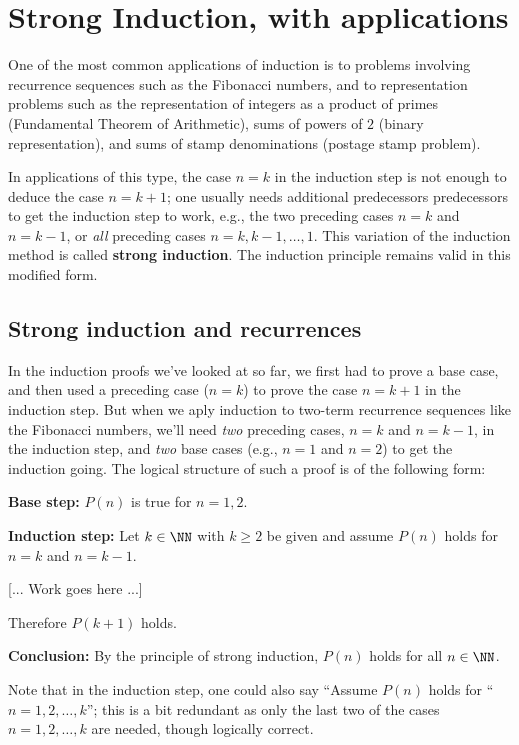 \section{Strong Induction, with applications}
\label{sec:Induction:StrongInduction}


One of the most common applications of induction is to problems involving
recurrence sequences such as the Fibonacci numbers, and to representation
problems such as the representation of integers as a product of primes
(Fundamental Theorem of Arithmetic), sums of powers of $2$ (binary
representation), and sums of stamp denominations (postage stamp problem).

In applications of this type, the case $n=k$ in the induction step is
not enough to deduce the case $n=k+1$; one usually needs additional
predecessors predecessors to get the induction step to work, e.g., 
the two preceding cases $n=k$ and $n=k-1$, or 
\emph{all} preceding cases
$n=k,k-1,\dots,1$.  This variation of the induction
method is called \textbf{strong induction}.  The induction principle
remains valid in this modified form. 


\subsection*{Strong induction and recurrences}
In the induction proofs we've looked at so far, we first had to prove a base case, and then used a preceding case ($n=k$) to prove the case $n=k+1$ in the induction step. But when we aply  induction to two-term recurrence sequences like the Fibonacci
numbers, we'll need \emph{two} preceding cases, $n=k$ and $n=k-1$, in
the induction step, and \emph{two} base cases (e.g., $n=1$ and $n=2$) to get
the induction going.  The logical structure of such a proof is of the
following form:

\noindent
\textbf{Base step:}  $P(n)$ is true for $n=1,2$.
\smallskip

\noindent
\textbf{Induction step:} Let $k\in\NN$ with $k\ge 2$ be given
and assume $P(n)$ holds for $n=k$ and $n=k-1$.
\medskip

[... Work goes here ...] 
\medskip

\noindent
Therefore $P(k+1)$ holds.
\smallskip

\noindent
\textbf{Conclusion:} By the principle of strong induction, 
$P(n)$ holds for all $n\in\NN$.
\smallskip

\noindent
Note that in the induction step, one could also say ``Assume
$P(n)$ holds for `` $n=1,2,\dots, k$''; this is a bit redundant as only
the last two of the cases $n=1,2,\dots,k$ are needed, though logically
correct. 

